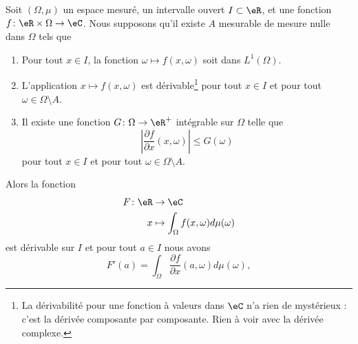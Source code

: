 \begin{theorem}    \label{ThoMWpRKYp}
	Soit \( (\Omega,\mu)\) un espace mesuré, un intervalle ouvert \( I\subset \eR\), et une fonction \( f\colon \eR\times \Omega\to \eC\). Nous supposons qu'il existe \( A\) mesurable de mesure nulle dans \( \Omega\) tels que
	\begin{enumerate}
		\item       \label{ITEMooAFVMooAeCEco}
		      Pour tout \( x\in I\), la fonction \( \omega\mapsto f(x,\omega)\) soit dans \( L^1(\Omega)\).
		\item        \label{ITEMooXIZXooGPYFyT}
		      L'application \( x\mapsto f(x,\omega)\) est dérivable\footnote{La dérivabilité pour une fonction à valeurs dans \( \eC\) n'a rien de mystérieux : c'est la dérivée composante par composante. Rien à voir avec la dérivée complexe.} pour tout \( x\in I\) et pour tout \( \omega\in \Omega\setminus A\).
		\item       \label{ITEMooDTTIooWkldfB}
		      Il existe une fonction \( G\colon \Omega\to \eR^+\) intégrable sur \( \Omega\) telle que
		      \begin{equation}        \label{EQooUHQYooHtwfML}
			      \left| \frac{ \partial f }{ \partial x }(x,\omega) \right| \leq G(\omega)
		      \end{equation}
		      pour tout \( x\in I\) et pour tout \( \omega\in\Omega\setminus A\).
	\end{enumerate}
	Alors la fonction
	\begin{equation}
		\begin{aligned}
			F\colon \eR & \to \eC                                      \\
			x           & \mapsto \int_{\Omega}f(x,\omega)d\mu(\omega)
		\end{aligned}
	\end{equation}
	est dérivable sur \( I\) et pour tout \( a\in I\) nous avons
	\begin{equation}
		F'(a)=\int_{\Omega}\frac{ \partial f }{ \partial x }(a,\omega)d\mu(\omega),
	\end{equation}
\end{theorem}

